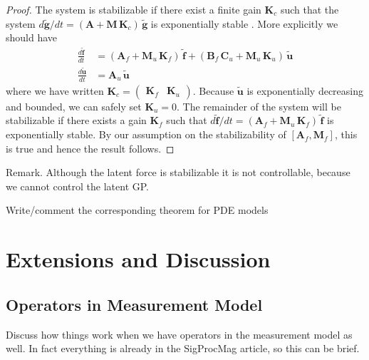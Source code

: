 \documentclass[journal]{IEEEtran}
\newcommand{\simo}[1]{{\color{red}#1}}
\begin{document}
\begin{proof}
The system is stabilizable if there exist a finite gain $\mathbf{K}_c$ such that the system $d\tilde{\mathbf{g}}/dt = (\mathbf{A} + \mathbf{M} \, \mathbf{K}_c) \, \tilde{\mathbf{g}}$ is exponentially stable \cite{Wonham:1985}. More explicitly we should have
%
\begin{equation}
\begin{split}
  \frac{d\tilde{\mathbf{f}}}{dt} &= (\mathbf{A}_f + \mathbf{M}_u \, \mathbf{K}_f) \, \tilde{\mathbf{f}}
  + (\mathbf{B}_f \, \mathbf{C}_u + \mathbf{M}_u \, \mathbf{K}_u) \, \tilde{\mathbf{u}} \\
  \frac{d\tilde{\mathbf{u}}}{dt} &= \mathbf{A}_u \, \tilde{\mathbf{u}}
\end{split}
\end{equation}
%
where we have written $\mathbf{K}_c = \begin{pmatrix} \mathbf{K}_f & \mathbf{K}_u \end{pmatrix}$. Because $\tilde{\mathbf{u}}$ is exponentially decreasing and bounded, we can safely set $\mathbf{K}_u = 0$. The remainder of the system will be stabilizable if there exists a gain $\mathbf{K}_f$ such that $d\tilde{\mathbf{f}}/dt = (\mathbf{A}_f + \mathbf{M}_u \, \mathbf{K}_f) \, \tilde{\mathbf{f}}$ is exponentially stable. By our assumption on the stabilizability of $[\mathbf{A}_f,\mathbf{M}_f]$, this is true and hence the result follows.
\end{proof}

\simo{Remark. Although the latent force is stabilizable it is not controllable, because we cannot control the latent GP. }

\simo{Write/comment the corresponding theorem for PDE models}


\section{Extensions and Discussion}

\subsection{Operators in Measurement Model}

\simo{Discuss how things work when we have operators in the measurement model as well. In fact everything is already in the SigProcMag article, so this can be brief.}
\end{document}
